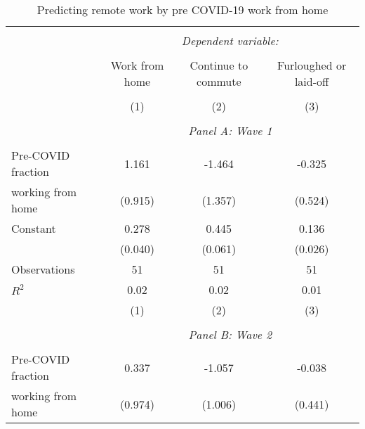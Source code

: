 \begin{table}[!htbp] \centering                    \caption{Predicting remote work by pre COVID-19 work from home}                    \label{tab:priorremotework}                  \small                  \begin{tabular}{@{\extracolsep{5pt}}lccc}                  \\[-1.8ex]\hline                  \hline \\[-1.8ex]                   & \multicolumn{3}{c}{\textit{Dependent variable:}} \\                   \cline{2-4}                   \\[-1.8ex] & Work from home & Continue to commute & Furloughed or laid-off \\                   \hline \\[-1.8ex]               
                    &\multicolumn{1}{c}{(1)}         &\multicolumn{1}{c}{(2)}         &\multicolumn{1}{c}{(3)}         \\
\hline \\               & \multicolumn{3}{c}{\textit{Panel A: Wave 1}} \\               \addlinespace[1mm] \\
Pre-COVID fraction  &       1.161         &      -1.464         &      -0.325         \\
working from home   &     (0.915)         &     (1.357)         &     (0.524)         \\
[1em]
Constant            &       0.278\sym{***}&       0.445\sym{***}&       0.136\sym{***}\\
                    &     (0.040)         &     (0.061)         &     (0.026)         \\
[1em]
Observations        &          51         &          51         &          51         \\
\(R^{2}\)           &        0.02         &        0.02         &        0.01         \\
                    &\multicolumn{1}{c}{(1)}         &\multicolumn{1}{c}{(2)}         &\multicolumn{1}{c}{(3)}         \\
\hline \\               & \multicolumn{3}{c}{\textit{Panel B: Wave 2}} \\               \addlinespace[1mm] \\
Pre-COVID fraction  &       0.337         &      -1.057         &      -0.038         \\
working from home   &     (0.974)         &     (1.006)         &     (0.441)         \\

\end{tabular}
\end{table}
